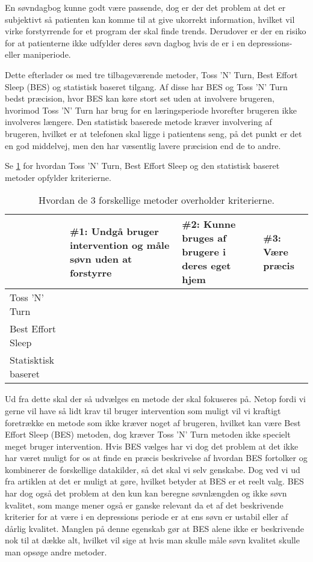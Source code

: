 En søvndagbog kunne godt være passende, dog er der det problem at det er subjektivt så patienten kan komme til at give ukorrekt information, hvilket vil virke forstyrrende for et program der skal finde trends.
Derudover er der en risiko for at patienterne ikke udfylder deres søvn dagbog hvis de er i en depressions- eller maniperiode.

Dette efterlader os med tre tilbageværende metoder, Toss 'N' Turn, Best Effort Sleep (BES) og statistisk baseret tilgang.
Af disse har BES og Toss 'N' Turn bedst præcision, hvor BES kan køre stort set uden at involvere brugeren, hvorimod Toss 'N' Turn har brug for en læringsperiode hvorefter brugeren ikke involveres længere.
Den statistisk baserede metode kræver involvering af brugeren, hvilket er at telefonen skal ligge i patientens seng, på det punkt er det en god middelvej, men den har væsentlig lavere præcision end de to andre.

Se \cref{tab:soevnMetodeKriterier} for hvordan Toss 'N' Turn, Best Effort Sleep og den statistisk baseret metoder opfylder kriterierne.

\begin{table}
\begin{tabular}{|p{4cm}|p{3cm}|p{3cm}|p{3cm}|}
	\hline  ~ & \#1: Undgå bruger intervention og måle søvn uden at forstyrre & \#2: Kunne bruges af brugere i deres eget hjem & \#3: Være præcis \\ 
	\hline Toss 'N' Turn &  & \checkmark & \checkmark \\ 
	\hline Best Effort Sleep & \checkmark & \checkmark & \checkmark \\ 
	\hline Statisktisk baseret &  & \checkmark &  \\ 
	\hline 
\end{tabular}
\caption{Hvordan de 3 forskellige metoder overholder kriterierne.}
\label{tab:soevnMetodeKriterier}
\end{table}

Ud fra dette skal der så udvælges en metode der skal fokuseres på. 
Netop fordi vi gerne vil have så lidt krav til bruger intervention som muligt vil vi kraftigt foretrække en metode som ikke kræver noget af brugeren, hvilket kan være Best Effort Sleep (BES) metoden, dog kræver Toss 'N' Turn metoden ikke specielt meget bruger intervention. 
Hvis BES vælges har vi dog det problem at det ikke har været muligt for os at finde en præcis beskrivelse af hvordan BES fortolker og kombinerer de forskellige datakilder, så det skal vi selv genskabe. 
Dog ved vi ud fra artiklen at det er muligt at gøre, hvilket betyder at BES er et reelt valg. 
BES har dog også det problem at den kun kan beregne søvnlængden og ikke søvn kvalitet, som mange mener også er ganske relevant da et af det beskrivende kriterier for at være i en depressions periode er at ens søvn er ustabil eller af dårlig kvalitet. 
Manglen på denne egenskab gør at BES alene ikke er beskrivende nok til at dække alt, hvilket vil sige at hvis man skulle måle søvn kvalitet skulle man opsøge andre metoder.


